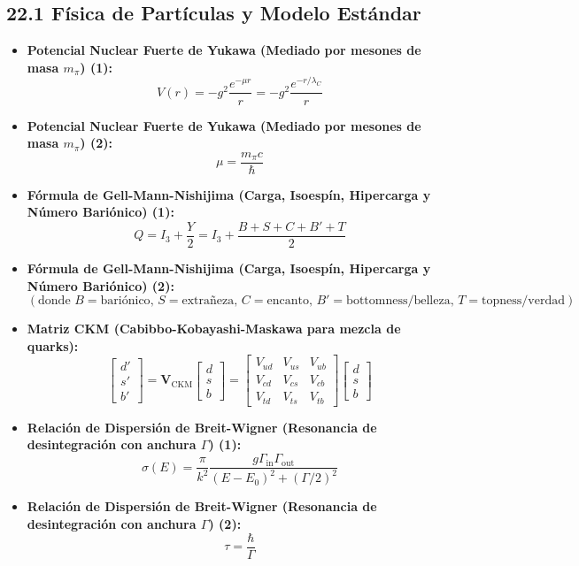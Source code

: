 \documentclass[11pt,a4paper]{article}
\begin{document}
\subsection*{22.1 Física de Partículas y Modelo Estándar}

\begin{itemize}
  \item \textbf{Potencial Nuclear Fuerte de Yukawa (Mediado por mesones de masa $m_\pi$) (1):}
  \[
    V(r) = -g^2 \frac{e^{-\mu r}}{r} = -g^2 \frac{e^{-r / \lambda_C}}{r}
  \]
  \item \textbf{Potencial Nuclear Fuerte de Yukawa (Mediado por mesones de masa $m_\pi$) (2):}
  \[
    \mu = \frac{m_\pi c}{\hbar}
  \]
  \item \textbf{Fórmula de Gell-Mann-Nishijima (Carga, Isoespín, Hipercarga y Número Bariónico) (1):}
  \[
    Q = I_3 + \frac{Y}{2} = I_3 + \frac{B + S + C + B' + T}{2}
  \]
  \item \textbf{Fórmula de Gell-Mann-Nishijima (Carga, Isoespín, Hipercarga y Número Bariónico) (2):}
  \[
    (\text{donde } B = \text{bariónico}, \, S = \text{extrañeza}, \, C = \text{encanto}, \, B' = \text{bottomness/belleza}, \, T = \text{topness/verdad})
  \]
  \item \textbf{Matriz CKM (Cabibbo-Kobayashi-Maskawa para mezcla de quarks):}
  \[
    \begin{bmatrix} d' \\ s' \\ b' \end{bmatrix} = \mathbf{V}_{\mathrm{CKM}} \begin{bmatrix} d \\ s \\ b \end{bmatrix} = \begin{bmatrix} V_{ud} & V_{us} & V_{ub} \\ V_{cd} & V_{cs} & V_{cb} \\ V_{td} & V_{ts} & V_{tb} \end{bmatrix} \begin{bmatrix} d \\ s \\ b \end{bmatrix}
  \]
  \item \textbf{Relación de Dispersión de Breit-Wigner (Resonancia de desintegración con anchura $\Gamma$) (1):}
  \[
    \sigma(E) = \frac{\pi}{k^2} \frac{g \Gamma_{\mathrm{in}} \Gamma_{\mathrm{out}}}{(E - E_0)^2 + (\Gamma/2)^2}
  \]
  \item \textbf{Relación de Dispersión de Breit-Wigner (Resonancia de desintegración con anchura $\Gamma$) (2):}
  \[
    \tau = \frac{\hbar}{\Gamma}
  \]
\end{itemize}
\end{document}
